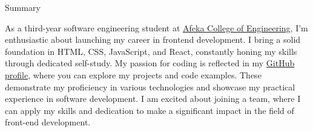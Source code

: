 \documentclass{resume}
\begin{document}

    \begin{rSection}{Summary}

        As a third-year software engineering student at \href{https://www.afeka.ac.il/}{Afeka College of Engineering}, I'm enthusiastic about launching my
        career in frontend development. I bring a solid foundation in HTML, CSS, JavaScript, and React,
        constantly honing my skills through dedicated self-study.
        My passion for coding is reflected in my \href{https://github.com/Asnvir}{GitHub profile}, where you can explore my projects and
        code examples. These demonstrate my proficiency in various technologies and showcase my
        practical experience in software development.
        I am excited about joining a team, where I can apply my skills and dedication to make a significant
        impact in the field of front-end development.


    \end{rSection}




\end{document}
